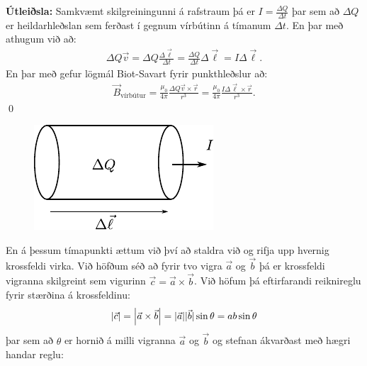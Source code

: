 \ifdefined \wholebook \else\documentclass[oneside]{book}\usepackage{EdlBook}\graphicspath{{figures/}}
\begin{document}
\textbf{Útleiðsla:} Samkvæmt skilgreiningunni á rafstraum þá er $I = \frac{\Delta Q}{\Delta t}$ þar sem að $\Delta Q$ er heildarhleðslan sem ferðast í gegnum vírbútinn á tímanum $\Delta t$. En þar með athugum við að:
\begin{align*}
    \Delta Q  \vec{v} = \Delta Q \frac{\Delta \vec{\ell}}{\Delta t} = \frac{\Delta Q}{\Delta t} \Delta \vec{\ell} = I \Delta \vec{\ell}.
\end{align*}
En þar með gefur lögmál Biot-Savart fyrir punkthleðslur að:
\begin{align*}
    \vec{B}_{\text{vírbútur}} = \frac{\mu_0}{4\pi} \frac{\Delta Q \vec{v} \times \vec{r}}{r^3} = \frac{\mu_0}{4\pi} \frac{I \Delta \vec{\ell} \times \vec{r}}{r^3}.
\end{align*}
\qed

\begin{figure}[H]
    \centering
    \includegraphics{figures/biot2.pdf}
\end{figure}

En á þessum tímapunkti ættum við því að staldra við og rifja upp hvernig krossfeldi virka. Við höfðum séð að fyrir tvo vigra $\vec{a}$ og $\vec{b}$ þá er krossfeldi vigranna skilgreint sem vigurinn $\vec{c} = \vec{a} \times \vec{b}$. Við höfum þá eftirfarandi reiknireglu fyrir stærðina á krossfeldinu:
\begin{align*}
    \abs{\vec{c}} = \abs{\vec{a} \times \vec{b}} = |\vec{a}||\vec{b}|\sin\theta = ab\sin\theta
\end{align*}
þar sem að $\theta$ er hornið á milli vigranna $\vec{a}$ og $\vec{b}$ og stefnan ákvarðast með hægri handar reglu:
\end{document}
